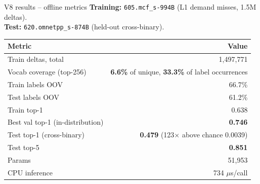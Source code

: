 \documentclass[10pt,aspectratio=169]{beamer}
\begin{document}
\begin{frame}{V8 results -- offline metrics}
  \textbf{Training:} \texttt{605.mcf\_s-994B} (L1 demand misses, 1.5M deltas).\\
  \textbf{Test:} \texttt{620.omnetpp\_s-874B} (held-out cross-binary).

  \vspace{0.4em}
  \begin{center}
  \footnotesize
  \begin{tabular}{lr}
    \toprule
    \textbf{Metric} & \textbf{Value} \\
    \midrule
    Train deltas, total                 & 1{,}497{,}771 \\
    Vocab coverage (top-256)            & \textbf{6.6\%} of unique, \textbf{33.3\%} of label occurrences \\
    Train labels OOV                    & 66.7\% \\
    Test labels OOV                     & 61.2\% \\
    \midrule
    Train top-1                         & 0.638 \\
    Best val top-1 (in-distribution)    & \textbf{0.746} \\
    Test top-1 (cross-binary)           & \textbf{0.479} (123$\times$ above chance 0.0039) \\
    Test top-5                          & \textbf{0.851} \\
    \midrule
    Params                              & 51{,}953 \\
    CPU inference                       & 734 $\mu$s/call \\
    \bottomrule
  \end{tabular}
  \end{center}
\end{frame}
\end{document}
